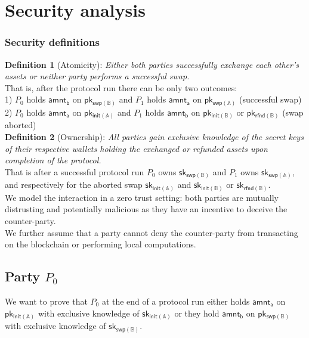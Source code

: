 \documentclass{article}      	%
\begin{document}
\newpage

\section{Security analysis}

\subsubsection*{Security definitions}

\textbf{Definition 1} (Atomicity): \textit{Either both parties successfully exchange each other's assets or neither party performs a successful swap.}
\vspace{0.5em}
\\
That is, after the protocol run there can be only two outcomes: \\
1) $P_0$ holds $\mathsf{amnt_b}$ on $\mathsf{pk_{swp(\mathbb{B})}}$ and $P_1$ holds $\mathsf{amnt_a}$ on $\mathsf{pk_{swp(\mathbb{A})}}$ (successful swap) \\
2) $P_0$ holds $\mathsf{amnt_a}$ on $\mathsf{pk_{init(\mathbb{A})}}$ and $P_1$ holds $\mathsf{amnt_b}$ on $\mathsf{pk_{init(\mathbb{B})}}$ or $\mathsf{pk_{rfnd(\mathbb{B})}}$ (swap aborted) \\

\textbf{Definition 2} (Ownership): \textit{All parties gain exclusive knowledge of the secret keys of their respective wallets holding the exchanged or refunded assets upon completion of the protocol.} 
\vspace{0.5em}
\\
That is after a successful protocol run $P_0$ owns $\mathsf{sk_{swp(\mathbb{B})}}$ and $P_1$ owns $\mathsf{sk_{swp(\mathbb{A})}}$, and respectively for the aborted swap  $\mathsf{sk_{init(\mathbb{A})}}$ and $\mathsf{sk_{init(\mathbb{B})}}$ or $\mathsf{sk_{rfnd(\mathbb{B})}}$. \\


We model the interaction in a zero trust setting: both parties are mutually distrusting and potentially malicious as they have an incentive to deceive the counter-party. \\
We further assume that a party cannot deny the counter-party from transacting on the blockchain or performing local computations.


\subsection{Party $P_0$}
We want to prove that $P_0$ at the end of a protocol run either holds $\mathsf{amnt_a}$ on $\mathsf{pk_{init(\mathbb{A})}}$ with exclusive knowledge of $\mathsf{sk_{init(\mathbb{A})}}$ or they hold $\mathsf{amnt_b}$ on $\mathsf{pk_{swp(\mathbb{B})}}$ with exclusive knowledge of $\mathsf{sk_{swp(\mathbb{B})}}$. \\
\end{document}
